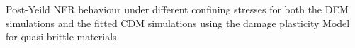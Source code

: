\label{fig:fitted2} Post-Yeild NFR behaviour under different confining stresses for both the DEM simulations and the fitted CDM simulations using the damage plasticity Model for quasi-brittle materials.